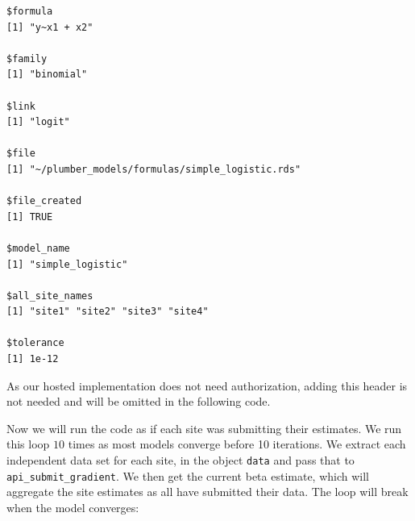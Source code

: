 \documentclass[]{elsarticle} %
\newenvironment{Shaded}{\begin{snugshade}}{\end{snugshade}}
\newcommand{\ControlFlowTok}[1]{\textcolor[rgb]{0.13,0.29,0.53}{\textbf{#1}}}
\newcommand{\DataTypeTok}[1]{\textcolor[rgb]{0.13,0.29,0.53}{#1}}
\newcommand{\DecValTok}[1]{\textcolor[rgb]{0.00,0.00,0.81}{#1}}
\newcommand{\KeywordTok}[1]{\textcolor[rgb]{0.13,0.29,0.53}{\textbf{#1}}}
\newcommand{\NormalTok}[1]{#1}
\newcommand{\OperatorTok}[1]{\textcolor[rgb]{0.81,0.36,0.00}{\textbf{#1}}}
\newcommand{\OtherTok}[1]{\textcolor[rgb]{0.56,0.35,0.01}{#1}}
\newcommand{\StringTok}[1]{\textcolor[rgb]{0.31,0.60,0.02}{#1}}
\begin{document}
\begin{verbatim}
$formula
[1] "y~x1 + x2"

$family
[1] "binomial"

$link
[1] "logit"

$file
[1] "~/plumber_models/formulas/simple_logistic.rds"

$file_created
[1] TRUE

$model_name
[1] "simple_logistic"

$all_site_names
[1] "site1" "site2" "site3" "site4"

$tolerance
[1] 1e-12
\end{verbatim}

As our hosted implementation does not need authorization, adding this header is not needed and will be omitted in the following code.

Now we will run the code as if each site was submitting their estimates. We run this loop \(10\) times as most models converge before 10 iterations. We extract each independent data set for each site, in the object \texttt{data} and pass that to \texttt{api\_submit\_gradient}. We then get the current beta estimate, which will aggregate the site estimates as all have submitted their data. The loop will break when the model converges:

\begin{Shaded}
\end{Shaded}
\end{document}
